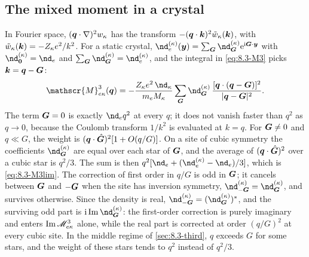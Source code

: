 \subsection{The mixed moment in a crystal}

In Fourier space, $(\bm{q}\cdot\nabla)^2w_\kappa$ has the transform $-(\bm{q}\cdot\bm{k})^2\tilde w_\kappa(\bm{k})$, with $\tilde w_\kappa(\bm{k}) = -Z_\kappa e^2/k^2$. For a static crystal, $\nd_e^{(\kappa)}(\vect{y}) = \sum_{\vect{G}}\nd^{(\kappa)}_{\vect{G}}\ee^{\ii\vect{G}\cdot\vect{y}}$ with $\nd^{(\kappa)}_{\vect{0}} = \nd_e$ and $\sum_{\vect{G}}\nd^{(\kappa)}_{\vect{G}} = \nd_e^{(\kappa)}$, and the integral in \cref{eq:8.3-M3} picks $\bm{k} = \bm{q} - \bm{G}$:
\begin{equation}
  \mathscr{M}^3_{e\kappa}(\vect{q}) = -\frac{Z_\kappa e^2\,\nd_\kappa}{m_eM_\kappa}\sum_{\vect{G}}\nd^{(\kappa)}_{\vect{G}}\,\frac{[\vect{q}\cdot(\vect{q} - \vect{G})]^2}{|\vect{q} - \vect{G}|^2} .
  \label{eq:D.26-Gsum}
\end{equation}
The term $\bm{G} = 0$ is exactly $\nd_eq^2$ at every $q$; it does not vanish faster than $q^2$ as $q \to 0$, because the Coulomb transform $1/k^2$ is evaluated at $k = q$. For $\bm{G} \neq 0$ and $q \ll G$, the weight is $(\bm{q}\cdot\hat{\bm{G}})^2[1 + O(q/G)]$. On a site of cubic symmetry the coefficients $\nd^{(\kappa)}_{\vect{G}}$ are equal over each star of $\bm{G}$, and the average of $(\bm{q}\cdot\hat{\bm{G}})^2$ over a cubic star is $q^2/3$. The sum is then $q^2[\nd_e + (\nd_e^{(\kappa)} - \nd_e)/3]$, which is \cref{eq:8.3-M3lim}. The correction of first order in $q/G$ is odd in $\bm{G}$; it cancels between $\bm{G}$ and $-\bm{G}$ when the site has inversion symmetry, $\nd^{(\kappa)}_{-\vect{G}} = \nd^{(\kappa)}_{\vect{G}}$, and survives otherwise. Since the density is real, $\nd^{(\kappa)}_{-\vect{G}} = (\nd^{(\kappa)}_{\vect{G}})^*$, and the surviving odd part is $\ii\Imag\nd^{(\kappa)}_{\vect{G}}$: the first-order correction is purely imaginary and enters $\operatorname{Im}\mathscr{M}^3_{e\kappa}$ alone, while the real part is corrected at order $(q/G)^2$ at every cubic site. In the middle regime of \cref{sec:8.3-third}, $q$ exceeds $G$ for some stars, and the weight of these stars tends to $q^2$ instead of $q^2/3$.

